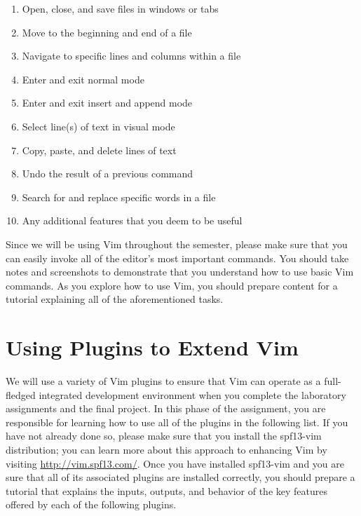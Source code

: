 \begin{enumerate}
  \itemsep 0em

        \item Open, close, and save files in windows or tabs
        \item Move to the beginning and end of a file
        \item Navigate to specific lines and columns within a file
        \item Enter and exit normal mode
        \item Enter and exit insert and append mode
        \item Select line(s) of text in visual mode
        \item Copy, paste, and delete lines of text
        \item Undo the result of a previous command
        \item Search for and replace specific words in a file
        \item Any additional features that you deem to be useful

\end{enumerate}

Since we will be using Vim throughout the semester, please make sure that you can easily invoke all of the editor's most
important commands.  You should take notes and screenshots to demonstrate that you understand how to use basic
Vim commands. As you explore how to use Vim, you should prepare content for a tutorial explaining all of the
aforementioned tasks.

\section*{Using Plugins to Extend Vim}

We will use a variety of Vim plugins to ensure that Vim can operate as a full-fledged integrated development environment
when you complete the laboratory assignments and the final project.  In this phase of the assignment, you are
responsible for learning how to use all of the plugins in the following list.  If you have not already done so, please
make sure that you install the spf13-vim distribution; you can learn more about this approach to enhancing Vim by
visiting \url{http://vim.spf13.com/}.  Once you have installed spf13-vim and you are sure that all of its associated
plugins are installed correctly, you should prepare a tutorial that explains the inputs, outputs, and behavior of the
key features offered by each of the following plugins.

